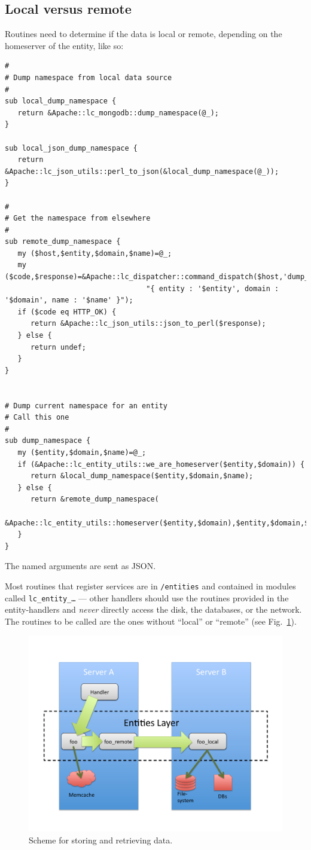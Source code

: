 \subsection{Local versus remote}
Routines need to determine if the data is local or remote, depending on the homeserver of the entity, like so:
\begin{verbatim}
#
# Dump namespace from local data source
#
sub local_dump_namespace {
   return &Apache::lc_mongodb::dump_namespace(@_);
}

sub local_json_dump_namespace {
   return &Apache::lc_json_utils::perl_to_json(&local_dump_namespace(@_));
}

#
# Get the namespace from elsewhere
#
sub remote_dump_namespace {
   my ($host,$entity,$domain,$name)=@_;
   my ($code,$response)=&Apache::lc_dispatcher::command_dispatch($host,'dump_namespace',
                                 "{ entity : '$entity', domain : '$domain', name : '$name' }");
   if ($code eq HTTP_OK) {
      return &Apache::lc_json_utils::json_to_perl($response);
   } else {
      return undef;
   }
}


# Dump current namespace for an entity
# Call this one
#
sub dump_namespace {
   my ($entity,$domain,$name)=@_;
   if (&Apache::lc_entity_utils::we_are_homeserver($entity,$domain)) {
      return &local_dump_namespace($entity,$domain,$name);
   } else {
      return &remote_dump_namespace(
             &Apache::lc_entity_utils::homeserver($entity,$domain),$entity,$domain,$name);
   }
}
\end{verbatim}
The named arguments are sent as JSON.

Most routines that register services are in {\tt /entities} and contained in modules called {\tt lc\_entity\_\ldots} --- other handlers should use the routines provided in the entity-handlers and {\it never} directly access the disk, the databases, or the network. The routines to be called are the ones without ``local'' or ``remote'' (see Fig.~\ref{fig:entities}).

\begin{figure}
\begin{center}
\includegraphics[width=12cm]{entities}
\end{center}
\caption{Scheme for storing and retrieving data.\label{fig:entities}}
\end{figure}


